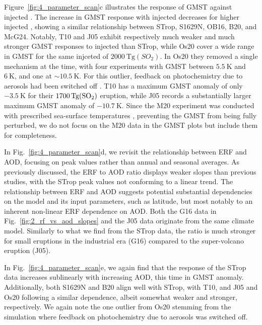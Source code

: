 \documentclass[draft]{agujournal2019}
\begin{document}
  Figure~\ref{fig:4_parameter_scan}c illustrates the response of GMST against injected
  . The increase in GMST response with injected  decreases for higher
  injected , showing a similar relationship between STrop, S1629N, OB16, B20,
  and McG24. Notably, T10 and J05 exhibit respectively much weaker and much stronger
  GMST responses to injected  than STrop, while Os20 cover a wide range in GMST
  for the same injceted  of \(\SI{2000}{\tera\gram(SO_{2})}\). In Os20 they
  removed a single mechanism at the time, with four experiments with GMST between
  \(\SI{5.5}{\kelvin}\) and \(\SI{6}{\kelvin}\), and one at \(\sim \SI{10.5}{\kelvin}\).
  For this outlier, feedback on photochemistry due to aerosols had been switched off
  \cite{osipov2020}. T10 has a maximum GMST anomaly of only \(\SI{-3.5}{\kelvin}\) for
  their \(\SI{1700}{\tera\gram(\ce{SO2})}\) eruption, while J05 records a substantially
  larger maximum GMST anomaly of \(\SI{-10.7}{\kelvin}\). Since the M20 experiment was
  conducted with prescribed sea-surface temperatures \cite{marshall2020}, preventing the
  GMST from being fully perturbed, we do not focus on the M20 data in the GMST plots but
  include them for completeness.

  In Fig.~\ref{fig:4_parameter_scan}d, we revisit the relationship between ERF and AOD,
  focusing on peak values rather than annual and seasonal averages. As previously
  discussed, the ERF to AOD ratio displays weaker slopes than previous studies, with the
  STrop peak values not conforming to a linear trend. The relationship between ERF and
  AOD suggests potential substantial dependencies on the model and its input parameters,
  such as latitude, but most notably to an inherent non-linear ERF dependence on AOD.
  Both the G16 data in Fig.~\ref{fig:2_rf_vs_aod_slopes} and the J05 data originate from
  the same climate model. Similarly to what we find from the STrop data, the ratio is
  much stronger for small eruptions in the industrial era (G16) compared to the
  super-volcano eruption (J05).

  In Fig.~\ref{fig:4_parameter_scan}e, we again find that the response of the STrop data
  increases sublinearly with increasing AOD, this time in GMST anomaly. Additionally,
  both S1629N and B20 align well with STrop, with T10, and J05 and Os20 following a
  similar dependence, albeit somewhat weaker and stronger, respectively. We again note
  the one outlier from Os20 stemming from the simulation where feedback on
  photochemistry due to aerosols was switched off.
\end{document}
